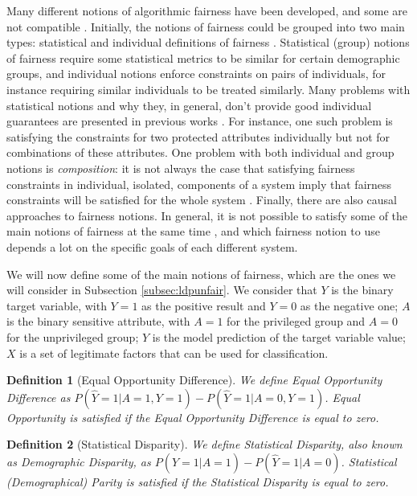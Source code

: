 \documentclass[conference]{IEEEtran}
\newtheorem{definition}{Definition}
\begin{document}
Many different notions of algorithmic fairness have been developed, and some are not compatible \cite{alves2023survey}. Initially, the notions of fairness could be grouped into two main types: statistical and individual definitions of fairness \cite{chouldechova2018frontiers}. Statistical (group) notions of fairness require some statistical metrics to be similar for certain demographic groups, and individual notions enforce constraints on pairs of individuals, for instance requiring similar individuals to be treated similarly. Many problems with statistical notions and why they, in general, don't provide good individual guarantees are presented in previous works \cite{Awareness}\cite{kearns2018preventing}. For instance, one such problem is satisfying the constraints for two protected attributes individually but not for combinations of these attributes. One problem with both individual and group notions is \emph{composition}: it is not always the case that satisfying fairness constraints in individual, isolated, components of a system imply that fairness constraints will be satisfied for the whole system \cite{dwork2018fairness}. Finally, there are also causal approaches to fairness notions. In general, it is not possible to satisfy some of the main notions of fairness at the same time \cite{hellman2020measuring}\cite{bell2023possibility}\cite{zemel2013learning}, and which fairness notion to use depends a lot on the specific goals of each different system.

We will now define some of the main notions of fairness, which are the ones we will consider in Subsection \ref{subsec:ldpunfair}. We consider that $Y$ is the binary target variable, with $Y=1$ as the positive result and $Y=0$ as the negative one; $A$ is the binary sensitive attribute, with $A=1$ for the privileged group and $A=0$ for the unprivileged group; $\hat Y$ is the model prediction of the target variable value; $X$ is a set of legitimate factors that can be used for classification.

\begin{definition}[Equal Opportunity Difference] We define \emph{Equal Opportunity Difference} as $P(\hat Y = 1| A = 1, Y =1) - P(\hat Y = 1| A = 0, Y = 1)$. Equal Opportunity is \emph{satisfied} if the Equal Opportunity Difference is equal to zero.
\end{definition}

\begin{definition}[Statistical Disparity] We define \emph{Statistical Disparity}, also known as \emph{Demographic Disparity}, as $P(\hat Y = 1| A = 1) - P(\hat Y = 1| A = 0)$. Statistical (Demographical) \emph{Parity} is \emph{satisfied} if the Statistical Disparity is equal to zero.
\end{definition}
\end{document}
